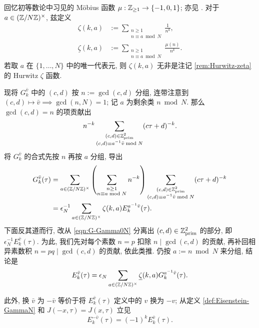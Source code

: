 回忆初等数论中习见的 Möbius 函数 $\mu: \mathbb{Z}_{\geq 1} \to \{-1,0,1\}$; 亦见 \cite[\S 5.4]{Li1}. 对于 $a \in (\mathbb{Z}/N\mathbb{Z})^\times$, 兹定义
\begin{equation}\label{eqn:aux-zeta}\begin{aligned}
	\zeta(k,a) & := \sum_{\substack{n \geq 1 \\ n \equiv a \bmod N}} \frac{1}{n^k}, \\
	\underline{\zeta}(k,a) & := \sum_{\substack{n \geq 1 \\ n \equiv a \bmod N}} \frac{\mu(n)}{n^k}.
\end{aligned}\end{equation}
若取 $a$ 在 $\{1, \ldots, N \}$ 中的唯一代表元, 则 $\zeta(k,a)$ 无非是注记 \ref{rem:Hurwitz-zeta} 的 Hurwitz $\zeta$ 函数.

现将 $G^{\bar{v}}_k$ 中的 $(c,d)$ 按 $n := \gcd(c,d)$ 分组, 连带注意到 $(c,d) \mapsto \bar{v} \implies \gcd(n,N)=1$; 记 $a$ 为剩余类 $n \bmod N$. 那么 $\gcd(c,d) = n$ 的项贡献出
\[ n^{-k} \sum_{\substack{(c,d) \in \mathbb{Z}^2_\text{prim} \\ (c,d) \equiv a^{-1}\bar{v} \bmod N }} (c\tau+d)^{-k}. \]
将 $G^{\bar{v}}_k$ 的合式先按 $n$ 再按 $a$ 分组, 导出
\begin{align*}
	G^{\bar{v}}_k(\tau) & = \sum_{a \in (\mathbb{Z}/N\mathbb{Z})^\times} \left(\sum_{\substack{n \geq 1 \\ n \equiv a \bmod N }} n^{-k} \right) \sum_{\substack{(c,d) \in \mathbb{Z}^2_\text{prim} \\ (c,d) \equiv a^{-1}\bar{v} \bmod N }} (c\tau+d)^{-k} \\
	& = \epsilon_N^{-1} \sum_{a \in (\mathbb{Z}/N\mathbb{Z})^\times} \zeta(k,a) E^{a^{-1}\bar{v}}_k(\tau).
\end{align*}
下面反其道而行, 改从 \eqref{eqn:G-Gamma0N} 分离出 $(c,d) \in \mathbb{Z}^2_{\text{prim}}$ 的部分, 即 $\epsilon_N^{-1} E^{\bar{v}}_k(\tau)$. 为此, 我们先对每个素数 $n=p$ 扣除 $n \mid \gcd(c,d)$ 的贡献, 再补回相异素数积 $n=pq \mid \gcd(c,d)$ 的贡献, 依此类推. 仍按 $a := n \bmod N$ 来分组, 结论是
\[ E^{\bar{v}}_k(\tau) = \epsilon_N \sum_{a \in (\mathbb{Z}/N\mathbb{Z})^\times} \underline{\zeta}(k,a) G^{a^{-1}\bar{v}}_k(\tau). \]

此外, 换 $\bar{v}$ 为 $-\bar{v}$ 等价于将 $E^{\bar{v}}_k(\tau)$ 定义中的 $v$ 换为 $-v$; 从定义 \ref{def:Eisenstein-GammaN} 和 $J(-x, \tau) = J(x, \tau)$ 立见
\begin{equation}\label{eqn:Eisenstein-Gamma-flip}
	E^{-\bar{v}}_k(\tau) = (-1)^k E^{\bar{v}}_k(\tau).
\end{equation}

